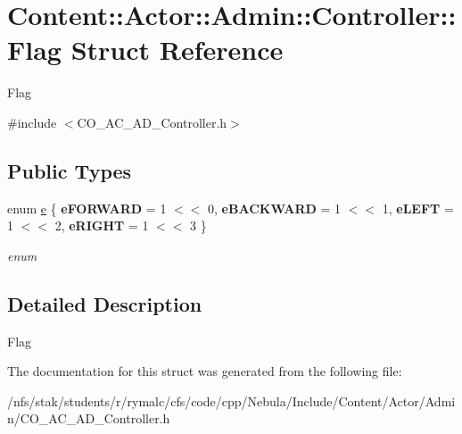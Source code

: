 \hypertarget{structContent_1_1Actor_1_1Admin_1_1Controller_1_1Flag}{
\section{Content::Actor::Admin::Controller::Flag Struct Reference}
\label{structContent_1_1Actor_1_1Admin_1_1Controller_1_1Flag}
}


Flag  


{\ttfamily \#include $<$CO\_\-AC\_\-AD\_\-Controller.h$>$}\subsection*{Public Types}
\begin{DoxyCompactItemize}
\item 
enum \hyperlink{structContent_1_1Actor_1_1Admin_1_1Controller_1_1Flag_a61794a195a566a5155505846ace19d31}{e} \{ {\bfseries eFORWARD} =  1 $<$$<$ 0, 
{\bfseries eBACKWARD} =  1 $<$$<$ 1, 
{\bfseries eLEFT} =  1 $<$$<$ 2, 
{\bfseries eRIGHT} =  1 $<$$<$ 3
 \}
\begin{DoxyCompactList}\small\item\em enum \item\end{DoxyCompactList}\end{DoxyCompactItemize}


\subsection{Detailed Description}
Flag 

The documentation for this struct was generated from the following file:\begin{DoxyCompactItemize}
\item 
/nfs/stak/students/r/rymalc/cfs/code/cpp/Nebula/Include/Content/Actor/Admin/CO\_\-AC\_\-AD\_\-Controller.h\end{DoxyCompactItemize}
